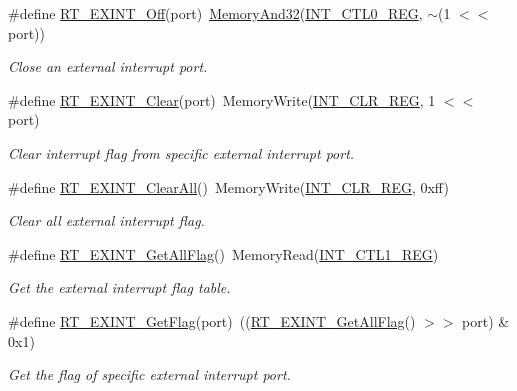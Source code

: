 \begin{DoxyCompactItemize}
\#define \mbox{\hyperlink{a00011_aa1a62e0954243f0c0fc8ec850ea2eebe}{R\+T\+\_\+\+E\+X\+I\+N\+T\+\_\+\+Off}}(port)~\mbox{\hyperlink{a00020_ad87cedffcaadc51db22594fce55173d4}{Memory\+And32}}(\mbox{\hyperlink{a00020_a8de95a7e93d24e973c34d5a2acb174d6}{I\+N\+T\+\_\+\+C\+T\+L0\+\_\+\+R\+EG}}, $\sim$(1 $<$$<$ port))
\begin{DoxyCompactList}\small\item\em Close an external interrupt port. \end{DoxyCompactList}\item 
\#define \mbox{\hyperlink{a00011_a1bebef46f3eb19ed0c71deb174a4bbaf}{R\+T\+\_\+\+E\+X\+I\+N\+T\+\_\+\+Clear}}(port)~Memory\+Write(\mbox{\hyperlink{a00020_a3db4a185cd2de3411b6de2dfee71a009}{I\+N\+T\+\_\+\+C\+L\+R\+\_\+\+R\+EG}}, 1 $<$$<$ port)
\begin{DoxyCompactList}\small\item\em Clear interrupt flag from specific external interrupt port. \end{DoxyCompactList}\item 
\#define \mbox{\hyperlink{a00011_a4f2cc857d9a0da5f06bbf5ff62babbdb}{R\+T\+\_\+\+E\+X\+I\+N\+T\+\_\+\+Clear\+All}}()~Memory\+Write(\mbox{\hyperlink{a00020_a3db4a185cd2de3411b6de2dfee71a009}{I\+N\+T\+\_\+\+C\+L\+R\+\_\+\+R\+EG}}, 0xff)
\begin{DoxyCompactList}\small\item\em Clear all external interrupt flag. \end{DoxyCompactList}\item 
\#define \mbox{\hyperlink{a00011_ab8287fc872a2d0ae785c8b3b51a37a5e}{R\+T\+\_\+\+E\+X\+I\+N\+T\+\_\+\+Get\+All\+Flag}}()~Memory\+Read(\mbox{\hyperlink{a00020_a854bd396a90c4c6b4415c106cb64281f}{I\+N\+T\+\_\+\+C\+T\+L1\+\_\+\+R\+EG}})
\begin{DoxyCompactList}\small\item\em Get the external interrupt flag table. \end{DoxyCompactList}\item 
\#define \mbox{\hyperlink{a00011_ae65409aaf69a9f495207ebbe133f161d}{R\+T\+\_\+\+E\+X\+I\+N\+T\+\_\+\+Get\+Flag}}(port)~((\mbox{\hyperlink{a00011_ab8287fc872a2d0ae785c8b3b51a37a5e}{R\+T\+\_\+\+E\+X\+I\+N\+T\+\_\+\+Get\+All\+Flag}}() $>$$>$ port) \& 0x1)
\begin{DoxyCompactList}\small\item\em Get the flag of specific external interrupt port. \end{DoxyCompactList}\end{DoxyCompactItemize}


